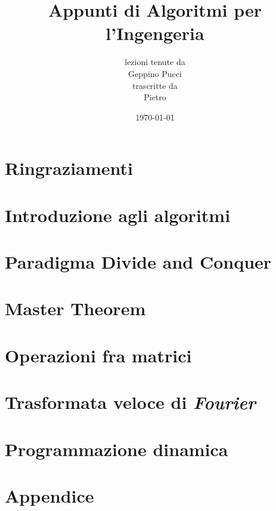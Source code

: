 \documentclass[a4paper,oneside]{book}
\title{Appunti di Algoritmi per l'Ingengeria}
\author{lezioni tenute da\\ Geppino Pucci \\ trascritte da \\ Pietro}
\date{\today}
\theoremstyle{definition}
\theoremstyle{theorem}
\theoremstyle{theorem}
\begin{document}
\pagestyle{plain}

% 
\maketitle

\cleardoublepage

\frontmatter %

\chapter*{Ringraziamenti}


\tableofcontents

\mainmatter

\pagestyle{fancy}

\chapter{Introduzione agli algoritmi}


\chapter{Paradigma Divide and Conquer}


\chapter{Master Theorem}


\chapter{Operazioni fra matrici}


\chapter{Trasformata veloce di \textit{Fourier}}


\chapter{Programmazione dinamica}


\cleardoublepage
{}


\cleardoublepage

\appendix
{}

\chapter{Appendice}

\end{document}
